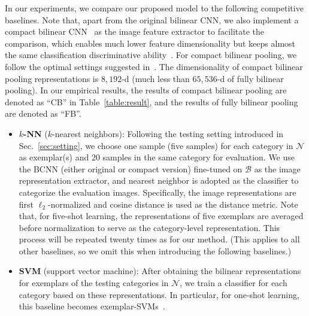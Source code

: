 \documentclass[10pt,twocolumn,letterpaper]{article}
\begin{document}
In our experiments, we compare our proposed model to the following competitive baselines. Note that, apart from the original bilinear CNN, we also implement a compact bilinear CNN~\cite{CB16CVPR} as the image feature extractor to facilitate the comparison, which enables much lower feature dimensionality but keeps almost the same classification discriminative ability~\cite{CB16CVPR}. For compact bilinear pooling, we follow the optimal settings suggested in~\cite{CB16CVPR}. The dimensionality of compact bilinear pooling representations is $8,192$-d (much less than $65,536$-d of fully bilinear pooling). In our empirical results, the results of compact bilinear pooling are denoted as ``CB'' in Table~\ref{table:result}, and the results of fully bilinear pooling are denoted as ``FB''.

\begin{itemize}
\item \textbf{$k$-NN} ($k$-nearest neighbors): Following the testing setting introduced in Sec.~\ref{sec:setting}, we choose one sample (five samples) for each category in $\mathcal{N}$ as exemplar(s) and $20$ samples in the same category for evaluation. We use the BCNN (either original or compact version) fine-tuned on $\mathcal{B}$ as the image representation extractor, and nearest neighbor is adopted as the classifier to categorize the evaluation images. Specifically, the image representations are first $\ell_2$-normalized and cosine distance is used as the distance metric. Note that, for five-shot learning, the representations of five exemplars are averaged before normalization to serve as the category-level representation. This process will be repeated twenty times as for our method. (This applies to all other baselines, so we omit this when introducing the following baselines.)

\item \textbf{SVM} (support vector machine): After obtaining the bilinear representations for exemplars of the testing categories in $\mathcal{N}$, we train a classifier for each category based on these representations. In particular, for one-shot learning, this baseline becomes exemplar-SVMs~\cite{exemplarSVM11ICCV}.


\end{itemize}
\end{document}
